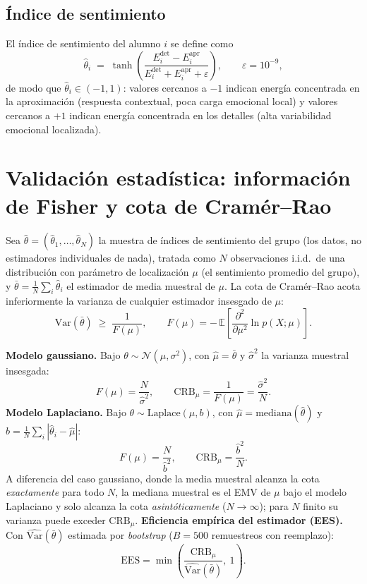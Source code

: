 \documentclass[11pt,a4paper,oneside]{article}
\theoremstyle{definition}
\begin{document}
\subsection{Índice de sentimiento}

El índice de sentimiento del alumno $i$ se define como
\[
\hat\theta_i \;=\; \tanh\!\left(\frac{E^{\mathrm{det}}_i - E^{\mathrm{apr}}_i}
{E^{\mathrm{det}}_i + E^{\mathrm{apr}}_i + \varepsilon}\right), \qquad \varepsilon = 10^{-9},
\]
de modo que $\hat\theta_i\in(-1,1)$: valores cercanos a $-1$ indican energía concentrada en la
aproximación (respuesta contextual, poca carga emocional local) y valores cercanos a $+1$
indican energía concentrada en los detalles (alta variabilidad emocional localizada).

\section{Validación estadística: información de Fisher y cota de Cramér--Rao}

Sea $\hat\theta = (\hat\theta_1,\ldots,\hat\theta_N)$ la muestra de índices de sentimiento del
grupo (los datos, no estimadores individuales de nada), tratada como $N$ observaciones
i.i.d.\ de una distribución con parámetro de localización $\mu$ (el sentimiento promedio del
grupo), y $\bar\theta = \frac1N\sum_i \hat\theta_i$ el estimador de media muestral de $\mu$. La
cota de Cramér--Rao acota inferiormente la varianza de cualquier estimador insesgado de $\mu$:
\[
\mathrm{Var}(\bar\theta) \;\ge\; \frac{1}{F(\mu)},
\qquad
F(\mu) = -\,\mathbb{E}\!\left[\frac{\partial^2}{\partial\mu^2}\ln p(X;\mu)\right].
\]

\begin{summaryBox}
\textbf{Modelo gaussiano.} Bajo $\theta\sim\mathcal N(\mu,\sigma^2)$, con
$\hat\mu=\bar\theta$ y $\hat\sigma^2$ la varianza muestral insesgada:
\[
F(\mu) = \frac{N}{\hat\sigma^2}, \qquad
\mathrm{CRB}_\mu = \frac{1}{F(\mu)} = \frac{\hat\sigma^2}{N}.
\]
\textbf{Modelo Laplaciano.} Bajo $\theta\sim\mathrm{Laplace}(\mu,b)$, con $\hat\mu=\mathrm{mediana}(\hat\theta)$
y $\hat b = \frac1N\sum_i |\hat\theta_i-\hat\mu|$:
\[
F(\mu) = \frac{N}{\hat b^2}, \qquad
\mathrm{CRB}_\mu = \frac{\hat b^2}{N}.
\]
A diferencia del caso gaussiano, donde la media muestral alcanza la cota \emph{exactamente} para
todo $N$, la mediana muestral es el EMV de $\mu$ bajo el modelo Laplaciano y solo alcanza la
cota \emph{asintóticamente} ($N\to\infty$); para $N$ finito su varianza puede exceder
$\mathrm{CRB}_\mu$.
\textbf{Eficiencia empírica del estimador (EES).} Con $\widehat{\mathrm{Var}}(\bar\theta)$
estimada por \emph{bootstrap} ($B=500$ remuestreos con reemplazo):
\[
\mathrm{EES} = \min\!\left(\frac{\mathrm{CRB}_\mu}{\widehat{\mathrm{Var}}(\bar\theta)},\ 1\right).
\]
\end{summaryBox}
\end{document}
